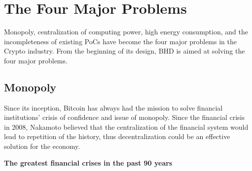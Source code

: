 \chapter{The Four Major Problems}
\begin{flushleft}
    Monopoly, centralization of computing power, high energy consumption, and the incompleteness of existing PoCs have become the four major problems in the Crypto industry. From the beginning of its design, BHD is aimed at solving the four major problems.
\end{flushleft}
\section{Monopoly}
\begin{flushleft}
    Since its inception, Bitcoin has always had the mission to solve financial institutions’ crisis of confidence and issue of monopoly. Since the financial crisis in 2008, Nakamoto believed that the centralization of the financial system would lead to repetition of the history, thus decentralization could be an effective solution for the economy.
\end{flushleft}
\begin{flushleft}
    \centering\textbf{The greatest financial crises in the past 90 years}
\end{flushleft}
